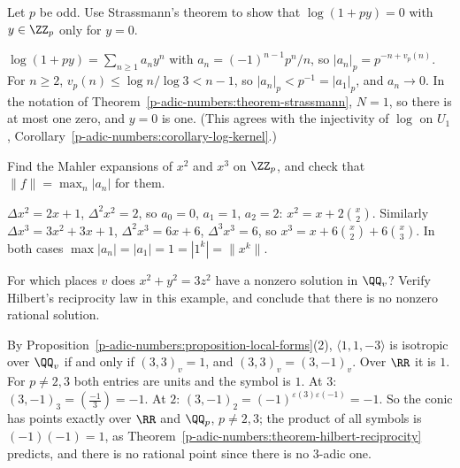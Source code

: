 \begin{exercise}\label{p-adic-numbers:exercise-log-zeros}
Let $p$ be odd. Use Strassmann's theorem to show that $\log(1 + py) = 0$ with $y \in \ZZ_p$ only for $y = 0$.
\end{exercise}

\begin{solution}
$\log(1 + py) = \sum_{n \geq 1}a_ny^n$ with $a_n = (-1)^{n-1}p^n/n$, so $|a_n|_p = p^{-n + v_p(n)}$. For $n \geq 2$, $v_p(n) \leq \log n/\log 3 < n - 1$, so $|a_n|_p < p^{-1} = |a_1|_p$, and $a_n \to 0$. In the
notation of Theorem~\ref{p-adic-numbers:theorem-strassmann}, $N = 1$, so there is at most one zero, and $y = 0$ is one. (This agrees with the injectivity of $\log$ on $U_1$,
Corollary~\ref{p-adic-numbers:corollary-log-kernel}.)
\end{solution}

\begin{exercise}\label{p-adic-numbers:exercise-mahler-squares}
Find the Mahler expansions of $x^2$ and $x^3$ on $\ZZ_p$, and check that $\|f\| = \max_n|a_n|$ for them.
\end{exercise}

\begin{solution}
$\Delta x^2 = 2x + 1$, $\Delta^2x^2 = 2$, so $a_0 = 0$, $a_1 = 1$, $a_2 = 2$: $x^2 = x + 2\binom x2$. Similarly $\Delta x^3 = 3x^2 + 3x + 1$, $\Delta^2x^3 = 6x + 6$, $\Delta^3x^3 = 6$, so
$x^3 = x + 6\binom x2 + 6\binom x3$. In both cases $\max|a_n| = |a_1| = 1 = |1^k| = \|x^k\|$.
\end{solution}

\begin{exercise}\label{p-adic-numbers:exercise-conic}
For which places $v$ does $x^2 + y^2 = 3z^2$ have a nonzero solution in $\QQ_v$? Verify Hilbert's reciprocity law in this example, and conclude that there is no nonzero rational solution.
\end{exercise}

\begin{solution}
By Proposition~\ref{p-adic-numbers:proposition-local-forms}(2), $\langle 1, 1, -3\rangle$ is isotropic over $\QQ_v$ if and only if $(3, 3)_v = 1$, and $(3, 3)_v = (3, -1)_v$. Over $\RR$ it is $1$. For $p \neq 2, 3$ both entries
are units and the symbol is $1$. At $3$: $(3, -1)_3 = (\frac{-1}{3}) = -1$. At $2$: $(3, -1)_2 = (-1)^{\varepsilon(3)\varepsilon(-1)} = -1$. So the conic has points exactly over $\RR$ and $\QQ_p$, $p \neq 2, 3$; the
product of all symbols is $(-1)(-1) = 1$, as Theorem~\ref{p-adic-numbers:theorem-hilbert-reciprocity} predicts, and there is no rational point since there is no $3$-adic one.
\end{solution}

